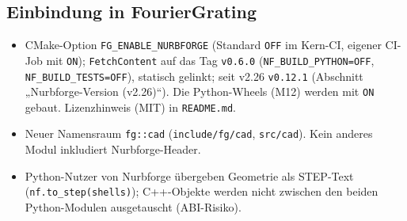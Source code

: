 \subsection{Einbindung in FourierGrating}
\begin{itemize}[nosep]
  \item CMake-Option \verb|FG_ENABLE_NURBFORGE| (Standard \verb|OFF| im Kern-CI, eigener CI-Job mit \verb|ON|);
        \verb|FetchContent| auf das Tag \verb|v0.6.0| (\verb|NF_BUILD_PYTHON=OFF|, \verb|NF_BUILD_TESTS=OFF|), statisch gelinkt;
        seit v2.26 \verb|v0.12.1| (Abschnitt „Nurbforge-Version (v2.26)“).
        Die Python-Wheels (M12) werden mit \verb|ON| gebaut. Lizenzhinweis (MIT) in \verb|README.md|.
  \item Neuer Namensraum \verb|fg::cad| (\verb|include/fg/cad|, \verb|src/cad|). Kein anderes Modul inkludiert Nurbforge-Header.
  \item Python-Nutzer von Nurbforge übergeben Geometrie als STEP-Text (\verb|nf.to_step(shells)|); C++-Objekte werden
        nicht zwischen den beiden Python-Modulen ausgetauscht (ABI-Risiko).
\end{itemize}

